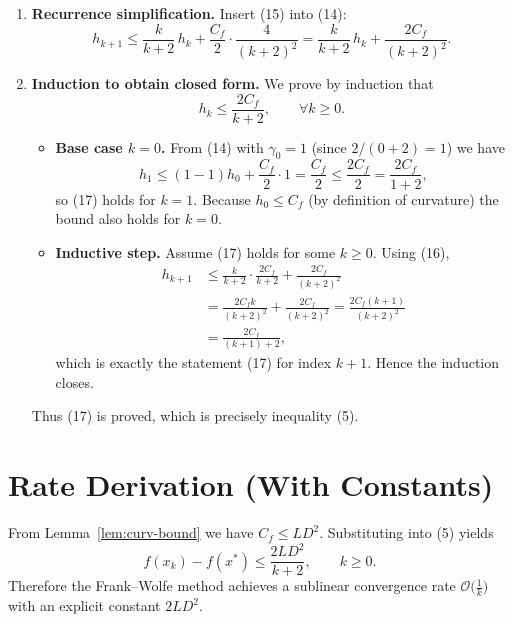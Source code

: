 \documentclass[11pt]{article}
\begin{document}
\begin{enumerate}[label=[Step \arabic*], leftmargin=*]
\item \textbf{Recurrence simplification.}  
Insert (15) into (14):
\[
h_{k+1}\le \frac{k}{k+2}\,h_{k}+ \frac{C_{f}}{2}\cdot\frac{4}{(k+2)^{2}}
= \frac{k}{k+2}\,h_{k}+ \frac{2C_{f}}{(k+2)^{2}}.
\tag{16}
\]

\item \textbf{Induction to obtain closed form.}  
We prove by induction that
\[
h_{k}\le \frac{2C_{f}}{k+2},\qquad\forall k\ge0.
\tag{17}
\]

\begin{itemize}
\item \textbf{Base case $k=0$.}  
From (14) with $\gamma_{0}=1$ (since $2/(0+2)=1$) we have
\[
h_{1}\le (1-1)h_{0}+ \frac{C_{f}}{2}\cdot1 = \frac{C_{f}}{2}
\le \frac{2C_{f}}{2}= \frac{2C_{f}}{1+2},
\]
so (17) holds for $k=1$. Because $h_{0}\le C_{f}$ (by definition of curvature) the bound also holds for $k=0$.

\item \textbf{Inductive step.}  
Assume (17) holds for some $k\ge0$. Using (16),
\[
\begin{aligned}
h_{k+1}
&\le \frac{k}{k+2}\cdot\frac{2C_{f}}{k+2}+ \frac{2C_{f}}{(k+2)^{2}}\\[4pt]
&= \frac{2C_{f}k}{(k+2)^{2}}+\frac{2C_{f}}{(k+2)^{2}}
= \frac{2C_{f}(k+1)}{(k+2)^{2}}\\[4pt]
&= \frac{2C_{f}}{(k+1)+2},
\end{aligned}
\]
which is exactly the statement (17) for index $k+1$. Hence the induction
closes.
\end{itemize}
Thus (17) is proved, which is precisely inequality (5). \hfill\qedsymbol
\end{enumerate}

\section*{Rate Derivation (With Constants)}
From Lemma~\ref{lem:curv-bound} we have $C_{f}\le LD^{2}$. Substituting into (5) yields
\[
f(x_{k})-f(x^{*})\le \frac{2LD^{2}}{k+2},
\qquad k\ge0.
\tag{18}
\]
Therefore the Frank–Wolfe method achieves a sublinear convergence rate
$\mathcal{O}\!\bigl(\tfrac{1}{k}\bigr)$ with an explicit constant $2LD^{2}$.
\end{document}
